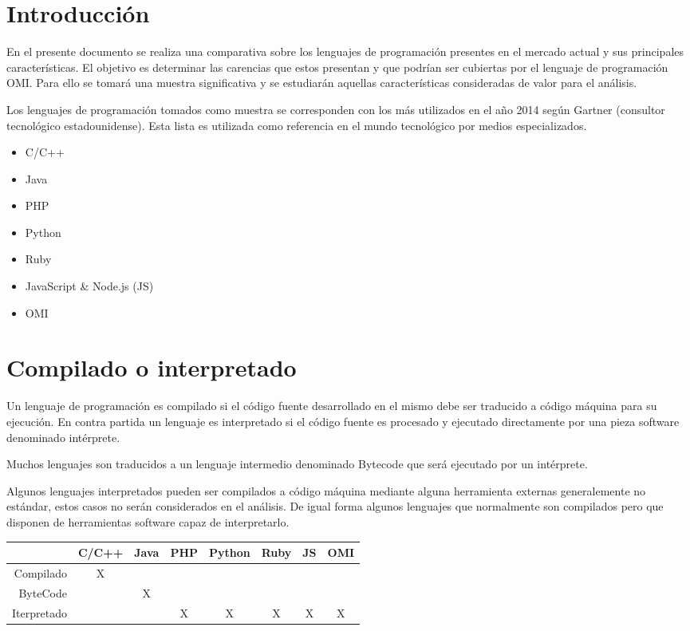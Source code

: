    
\section{Introducción}
En el presente documento se realiza una comparativa sobre los lenguajes de programación presentes en el mercado actual y sus principales 
características. El objetivo es determinar las carencias que estos presentan y que podrían ser cubiertas por el lenguaje de programación OMI.
Para ello se tomará una muestra significativa y se estudiarán aquellas características consideradas de valor para el análisis.

Los lenguajes de programación tomados como muestra se corresponden con los más utilizados en el año 2014 
según Gartner (consultor tecnológico estadounidense). Esta lista es utilizada como referencia en el mundo tecnológico
por medios especializados.

\begin{itemize}
   \item C/C++
   \item Java
   \item PHP
   \item Python
   \item Ruby
   \item JavaScript \& Node.js (JS)
   \item OMI
\end{itemize}

\section{Compilado o interpretado}
Un lenguaje de programación es compilado si el código fuente desarrollado en el mismo 
debe ser traducido a código máquina para su ejecución. En contra partida un lenguaje 
es interpretado si el código fuente es procesado y ejecutado directamente por una pieza software denominado intérprete.

Muchos lenguajes son traducidos a un lenguaje intermedio denominado Bytecode que 
será ejecutado por un intérprete.

Algunos lenguajes interpretados pueden ser compilados a código máquina mediante alguna herramienta
externas generalemente no estándar, estos casos no serán considerados en el análisis. De igual forma
algunos lenguajes que normalmente son compilados pero que disponen de herramientas software capaz de interpretarlo.

 
 \FloatBarrier
\begin{table}[h]
 \begin{center}
\begin{tabular}{|r|c|c|c|c|c|c|c|} \hline
 & C/C++ & Java & PHP  & Python & Ruby & JS & OMI \\ \hline
Compilado & X &  &  &  &  &  &  \\ \hline
ByteCode &  & X &  &  &  &  &  \\ \hline
Iterpretado & & & X & X & X & X & X \\ \hline
\end{tabular}

\end{center}
\end{table}
\FloatBarrier

